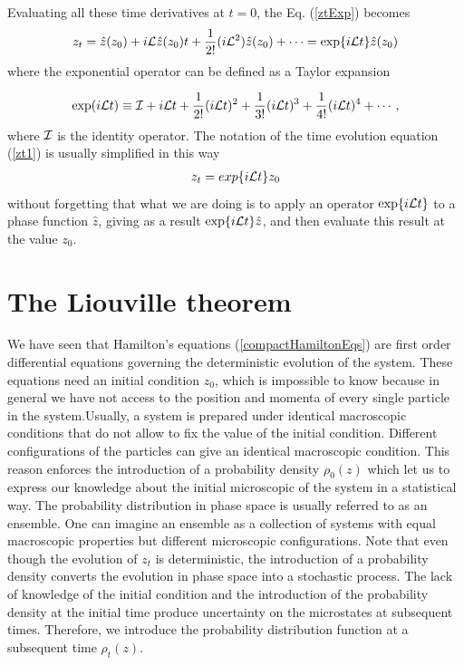 \documentclass[a4paper,openright,12pt]{book}
\begin{document}
Evaluating all these time derivatives at $t=0$, the Eq. (\ref{ztExp}) becomes
\begin{align}
    z_t=\hat{z}(z_0)+i{\cal L}\hat{z}(z_0)t
    +\frac{1}{2!}(i{\cal L}^2)\hat{z}(z_0)
    +\cdots
    ={\rm exp}\{i{\cal L}t\}\hat{z}(z_0)
    \label{zt1}
\end{align}
where the exponential operator can be defined as a Taylor expansion

\begin{align}
  {\rm exp}(i{\cal L}t) \equiv {\cal I} + i{\cal L}t + \frac{1}{2!}(i{\cal L}t)^2 + \frac{1}{3!}(i{\cal L}t)^3 +  \frac{1}{4!}(i{\cal L}t)^4 + \cdots,
\end{align}
where ${\cal I}$ is the identity operator.
The notation of the time evolution equation (\ref{zt1}) is usually simplified in this way 
\begin{align}
  z_t = exp\{i{\cal L}t\}z_0
  \label{zt}
\end{align}
without forgetting that what we are doing is to apply an operator ${\rm exp}\{i{\cal L}t\}$ to a phase function $\hat{z}$, giving as a result ${\rm exp}\{i{\cal L}t\}\hat{z}$, and then evaluate this result at the value $z_0$.


\section{The Liouville theorem}
We have seen that Hamilton's equations (\ref{compactHamiltonEqs}) are first order differential equations governing the deterministic evolution of the system. 
These equations need an initial condition $z_0$, which is impossible to know because in general we have not access to the position and momenta of every single particle in the system.Usually, a system is prepared under identical macroscopic conditions that do not allow to fix the value of the initial condition. 
Different configurations of the particles can give an identical macroscopic condition. 
This reason enforces the introduction of a probability density $\rho_0(z)$ which let us to express our knowledge about the initial microscopic of the system in a statistical way. The probability distribution in phase space is usually referred to as an ensemble. One can imagine an ensemble as a collection of systems with equal macroscopic properties but different microscopic configurations.
Note that even though the evolution of $z_t$ is deterministic, the introduction of a probability density converts the evolution in phase space into a stochastic process.
The lack of knowledge of the initial condition and the introduction of the probability density at the initial time produce uncertainty on the microstates at subsequent times. Therefore, we introduce the probability distribution function at a subsequent time $\rho_t(z)$.
\end{document}
